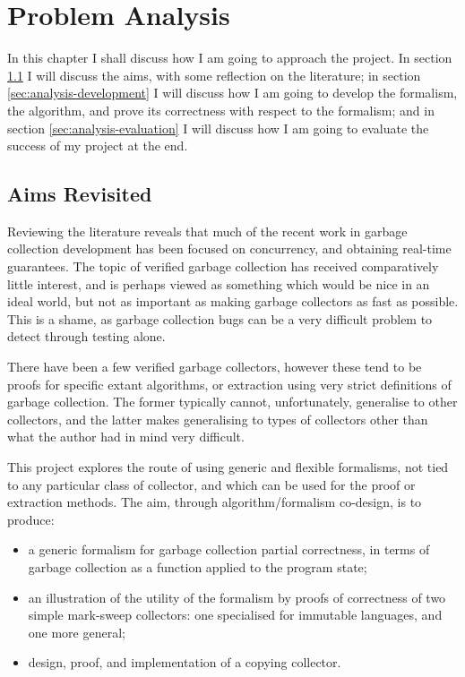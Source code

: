 \chapter{Problem Analysis}
\label{sec:analysis}

In this chapter I shall discuss how I am going to approach the
project. In section \ref{sec:analysis-aims} I will discuss the aims,
with some reflection on the literature; in section
\ref{sec:analysis-development} I will discuss how I am going to
develop the formalism, the algorithm, and prove its correctness with
respect to the formalism; and in section \ref{sec:analysis-evaluation}
I will discuss how I am going to evaluate the success of my project at
the end.

\section{Aims Revisited}
\label{sec:analysis-aims}

Reviewing the literature reveals that much of the recent work in
garbage collection development has been focused on concurrency, and
obtaining real-time guarantees. The topic of verified garbage
collection has received comparatively little interest, and is perhaps
viewed as something which would be nice in an ideal world, but not as
important as making garbage collectors as fast as possible. This is a
shame, as garbage collection bugs can be a very difficult problem to
detect through testing alone.

There have been a few verified garbage collectors, however these tend
to be proofs for specific extant algorithms, or extraction using very
strict definitions of garbage collection. The former typically cannot,
unfortunately, generalise to other collectors, and the latter makes
generalising to types of collectors other than what the author had in
mind very difficult.

This project explores the route of using generic and flexible
formalisms, not tied to any particular class of collector, and which
can be used for the proof or extraction methods. The aim, through
algorithm/formalism co-design, is to produce:

\begin{itemize}
  \item a generic formalism for garbage collection partial
    correctness, in terms of garbage collection as a function applied
    to the program state;

  \item an illustration of the utility of the formalism by proofs of
    correctness of two simple mark-sweep collectors: one specialised
    for immutable languages, and one more general;

  \item design, proof, and implementation of a copying collector.
\end{itemize}

